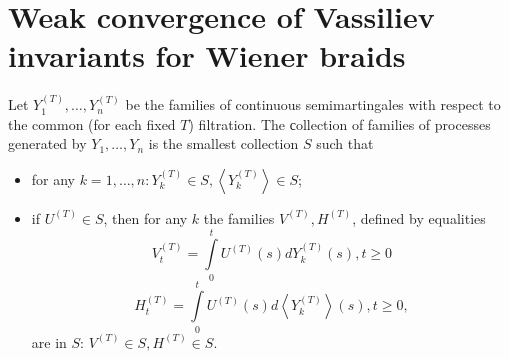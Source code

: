 \documentclass[12pt, a4paper, titlepage]{article}
\begin{document}
\section{Weak convergence of Vassiliev invariants for Wiener braids}\label{weakConvergenceOfVassiliev}
\begin{definition}
  Let $Y_1^{(T)}, \ldots, Y_n^{(T)}$ be the families of continuous semimartingales
with respect to the common (for each fixed $T$) filtration.  
The сollection of families of processes generated by $Y_1, \ldots, Y_n$
is the smallest collection $S$ such that
\begin{itemize}
 \item for any $k=1, \ldots, n \colon Y_k^{(T)}\in S, \left<Y_k^{(T)}\right> \in S$;
 \item if $U^{(T)}\in S$, then for any $k$ the families $V^{(T)}, H^{(T)}$, 
defined by equalities
$$V^{(T)}_t = \int\limits_0^t U^{(T)}(s)dY_k^{(T)}(s), t \ge 0$$
$$H^{(T)}_t = \int\limits_0^t U^{(T)}(s)d\left<Y_k^{(T)}\right>(s), t \ge 0,$$
are in $S$: $V^{(T)}\in S, H^{(T)}\in S.$
\end{itemize}
\end{definition}
\end{document}
